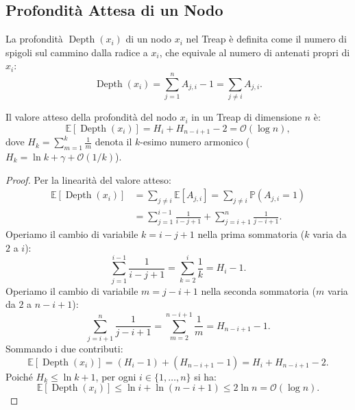 \FloatBarrier
\subsection{Profondit\`a Attesa di un Nodo}
La profondit\`a $\operatorname{Depth}(x_i)$ di un nodo $x_i$ nel Treap \`e definita come il numero di spigoli sul cammino dalla radice a $x_i$, che equivale al numero di antenati propri di $x_i$:
\begin{equation}
  \operatorname{Depth}(x_i) = \sum_{j=1}^n A_{j, i} - 1 = \sum_{j \neq i} A_{j, i}.
\end{equation}

\begin{theorem}
Il valore atteso della profondit\`a del nodo $x_i$ in un Treap di dimensione $n$ \`e:
\begin{equation}
  \mathbb{E}[\operatorname{Depth}(x_i)] = H_i + H_{n - i + 1} - 2 = \mathcal{O}(\log n),
\end{equation}
dove $H_k = \sum_{m=1}^k \frac{1}{m}$ denota il $k$-esimo numero armonico ($H_k = \ln k + \gamma + \mathcal{O}(1/k)$).
\end{theorem}

\begin{proof}
Per la linearit\`a del valore atteso:
\begin{align}
  \mathbb{E}[\operatorname{Depth}(x_i)] &= \sum_{j \neq i} \mathbb{E}[A_{j, i}] = \sum_{j \neq i} \mathbb{P}(A_{j, i} = 1) \nonumber \\
  &= \sum_{j=1}^{i-1} \frac{1}{i - j + 1} + \sum_{j=i+1}^n \frac{1}{j - i + 1}.
\end{align}
Operiamo il cambio di variabile $k = i - j + 1$ nella prima sommatoria ($k$ varia da $2$ a $i$):
\begin{equation}
  \sum_{j=1}^{i-1} \frac{1}{i - j + 1} = \sum_{k=2}^i \frac{1}{k} = H_i - 1.
\end{equation}
Operiamo il cambio di variabile $m = j - i + 1$ nella seconda sommatoria ($m$ varia da $2$ a $n - i + 1$):
\begin{equation}
  \sum_{j=i+1}^n \frac{1}{j - i + 1} = \sum_{m=2}^{n - i + 1} \frac{1}{m} = H_{n - i + 1} - 1.
\end{equation}
Sommando i due contributi:
\begin{equation}
  \mathbb{E}[\operatorname{Depth}(x_i)] = (H_i - 1) + (H_{n - i + 1} - 1) = H_i + H_{n - i + 1} - 2.
\end{equation}
Poich\'e $H_k \le \ln k + 1$, per ogni $i \in \{1, \dots, n\}$ si ha:
\begin{equation}
  \mathbb{E}[\operatorname{Depth}(x_i)] \le \ln i + \ln(n - i + 1) \le 2 \ln n = \mathcal{O}(\log n).
\end{equation}
\end{proof}

